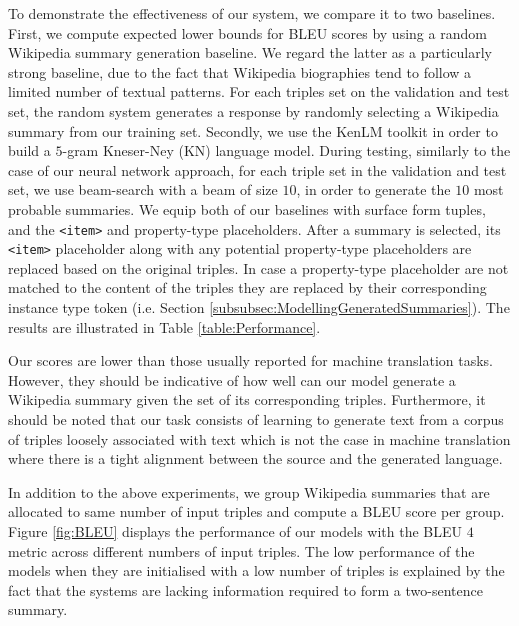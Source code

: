 \documentclass[preprint,5p]{elsarticle}
\begin{document}
To demonstrate the effectiveness of our system, we compare it to two baselines. First, we compute expected lower bounds for BLEU scores by using a random Wikipedia summary generation baseline. We regard the latter as a particularly strong baseline, due to the fact that Wikipedia biographies tend to follow a limited number of textual patterns. For each triples set on the validation and test set, the random system generates a response by randomly selecting a Wikipedia summary from our training set. Secondly, we use the KenLM toolkit \cite{Heafield2013} in order to build a $5$-gram Kneser-Ney (KN) language model. During testing, similarly to the case of our neural network approach, for each triple set in the validation and test set, we use beam-search with a beam of size $10$, in order to generate the $10$ most probable summaries. We equip both of our baselines with surface form tuples, and the \texttt{<item>} and property-type placeholders. After a summary is selected, its \texttt{<item>} placeholder along with any potential property-type placeholders are replaced based on the original triples. In case a property-type placeholder are not matched to the content of the triples they are replaced by their corresponding instance type token (i.e. Section \ref{subsubsec:ModellingGeneratedSummaries}). The results are illustrated in Table \ref{table:Performance}.


Our scores are lower than those usually reported for machine translation tasks. However, they should be indicative of how well can our model generate a Wikipedia summary given the set of its corresponding triples. Furthermore, it should be noted that our task consists of learning to generate text from a corpus of triples loosely associated with text which is not the case in machine translation where there is a tight alignment between the source and the generated language.





In addition to the above experiments, we group Wikipedia summaries that are allocated to same number of input triples and compute a BLEU score per group. Figure \ref{fig:BLEU} displays the performance of our models with the BLEU $4$ metric across different numbers of input triples. The low performance of the models when they are initialised with a low number of triples is explained by the fact that the systems are lacking information required to form a two-sentence summary.
\end{document}

